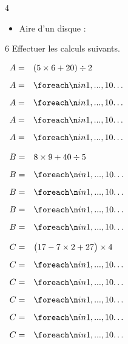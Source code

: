 \documentclass[a4paper]{book}
\begin{document}
{\begin{exerciceNote}{4}
\begin{enumerate}[leftmargin=*]
\begin{minipage}{0.49\linewidth}
\begin{itemize}
                    \medskip 
                    
                    \item Aire d'un disque : \points[3]
                \end{itemize}
            \end{minipage}

        \end{enumerate}
    \end{exerciceNote}


    \begin{exerciceNote}{6}
        Effectuer les calculs suivants.
   
        \begin{minipage}{0.3\linewidth}
            $\begin{array}{ll}
                A = & (5\times6+20)\div2 \\[2ex]
                A = & \points[10]\\[2ex]
                A = & \points[10]\\[2ex]
                A = & \points[10]\\[2ex]
                A = & \points[10]
            \end{array}$

            \bigskip

            $\begin{array}{ll}
                B = & 8\times9 + 40\div5 \\[2ex]
                B = & \points[10]\\[2ex]
                B = & \points[10]\\[2ex]
                B = & \points[10]\\[2ex]
                B = & \points[10]
            \end{array}$  
        \end{minipage}
        \vline
        \begin{minipage}{0.35\linewidth}
            $\begin{array}{ll}
                C = & \big(17-7\times2+27\big)\times4 \\[2ex]
                C = & \points[10]\\[2ex]
                C = & \points[10]\\[2ex]
                C = & \points[10]\\[2ex]
                C = & \points[10]\\[2ex]
                C = & \points[10]
            \end{array}$


\end{minipage}
\end{exerciceNote}}
\end{document}
